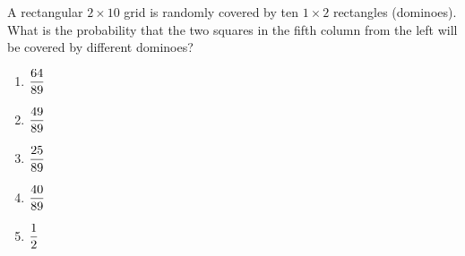 A rectangular $2 \times 10$ grid is randomly covered by ten $1 \times 2$ rectangles (dominoes). What is the probability that the two squares in the fifth column from the left will be covered by different dominoes?

\begin{enumerate}
\item $\displaystyle\frac{64}{89}$
\item $\displaystyle\frac{49}{89}$
\item $\displaystyle\frac{25}{89}$
\item $\displaystyle\frac{40}{89}$
\item $\displaystyle\frac{1}{2}$
\end{enumerate}
